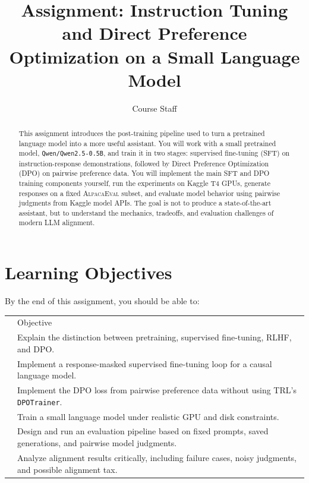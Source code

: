 \documentclass[11pt]{article}
\title{Assignment: Instruction Tuning and Direct Preference Optimization on a Small Language Model}
\author{Course Staff}
\date{}
\newcommand{\modelname}{\texttt{Qwen/Qwen2.5-0.5B}}
\newcommand{\alpaca}{\textsc{AlpacaEval}}
\newcommand{\checkmarkicon}{\textcolor{Teal}{\ding{51}}}
\begin{document}
\maketitle

\begin{abstract}
This assignment introduces the post-training pipeline used to turn a pretrained language model into a more useful assistant. You will work with a small pretrained model, \modelname, and train it in two stages: supervised fine-tuning (SFT) on instruction-response demonstrations, followed by Direct Preference Optimization (DPO) on pairwise preference data. You will implement the main SFT and DPO training components yourself, run the experiments on Kaggle T4 GPUs, generate responses on a fixed \alpaca{} subset, and evaluate model behavior using pairwise judgments from Kaggle model APIs. The goal is not to produce a state-of-the-art assistant, but to understand the mechanics, tradeoffs, and evaluation challenges of modern LLM alignment.
\end{abstract}

\tableofcontents
\newpage

\section{Learning Objectives}
By the end of this assignment, you should be able to:
\begin{center}
\renewcommand{\arraystretch}{1.22}
\begin{tabularx}{\textwidth}{>{\centering\arraybackslash}p{} X}
\rowcolor{MistBlue}
 & Objective \\
\checkmarkicon & Explain the distinction between pretraining, supervised fine-tuning, RLHF, and DPO. \\
\rowcolor{MistTeal}
\checkmarkicon & Implement a response-masked supervised fine-tuning loop for a causal language model. \\
\checkmarkicon & Implement the DPO loss from pairwise preference data without using TRL's \texttt{DPOTrainer}. \\
\rowcolor{MistTeal}
\checkmarkicon & Train a small language model under realistic GPU and disk constraints. \\
\checkmarkicon & Design and run an evaluation pipeline based on fixed prompts, saved generations, and pairwise model judgments. \\
\rowcolor{MistTeal}
\checkmarkicon & Analyze alignment results critically, including failure cases, noisy judgments, and possible alignment tax. \\
\end{tabularx}
\end{center}
\end{document}
